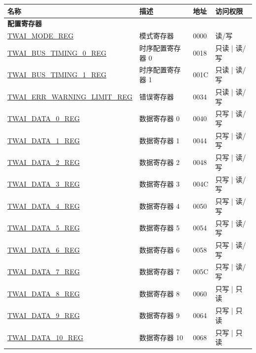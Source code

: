 \begin{longtable}{ | p{6cm} | p{6cm} | p{1.3cm} | p{2cm} | }
\hline\rowcolor{lightgray}
名称 & 描述 &  地址 & 访问权限 \\ \hline
\endhead
\multicolumn{4}{|l|}{\textbf{配置寄存器}} \\ \hline
\hyperref[regdesc:TWAIMODEREG]{TWAI\_MODE\_REG} & 模式寄存器 & \hexprefix{}0000 & 读/写 \\ \hline
\hyperref[regdesc:TWAIBUSTIMING0REG]{TWAI\_BUS\_TIMING\_0\_REG} & 时序配置寄存器 0 & \hexprefix{}0018 & 只读 | 读/写 \\ \hline
\hyperref[regdesc:TWAIBUSTIMING1REG]{TWAI\_BUS\_TIMING\_1\_REG} & 时序配置寄存器 1 & \hexprefix{}001C & 只读 | 读/写 \\ \hline
\hyperref[regdesc:TWAIERRWARNINGLIMITREG]{TWAI\_ERR\_WARNING\_LIMIT\_REG} & 错误寄存器 & \hexprefix{}0034 & 只读 | 读/写 \\ \hline
\hyperref[regdesc:TWAIDATA0REG]{TWAI\_DATA\_0\_REG} & 数据寄存器 0 & \hexprefix{}0040 & 只写 | 读/写 \\ \hline
\hyperref[regdesc:TWAIDATA1REG]{TWAI\_DATA\_1\_REG} & 数据寄存器 1 & \hexprefix{}0044 & 只写 | 读/写 \\ \hline
\hyperref[regdesc:TWAIDATA2REG]{TWAI\_DATA\_2\_REG} & 数据寄存器 2 & \hexprefix{}0048 & 只写 | 读/写 \\ \hline
\hyperref[regdesc:TWAIDATA3REG]{TWAI\_DATA\_3\_REG} & 数据寄存器 3 & \hexprefix{}004C & 只写 | 读/写 \\ \hline
\hyperref[regdesc:TWAIDATA4REG]{TWAI\_DATA\_4\_REG} & 数据寄存器 4 & \hexprefix{}0050 & 只写 | 读/写 \\ \hline
\hyperref[regdesc:TWAIDATA5REG]{TWAI\_DATA\_5\_REG} & 数据寄存器 5 & \hexprefix{}0054 & 只写 | 读/写 \\ \hline
\hyperref[regdesc:TWAIDATA6REG]{TWAI\_DATA\_6\_REG} & 数据寄存器 6 & \hexprefix{}0058 & 只写 | 读/写 \\ \hline
\hyperref[regdesc:TWAIDATA7REG]{TWAI\_DATA\_7\_REG} & 数据寄存器 7 & \hexprefix{}005C & 只写 | 读/写 \\ \hline
\hyperref[regdesc:TWAIDATA8REG]{TWAI\_DATA\_8\_REG} & 数据寄存器 8 & \hexprefix{}0060 & 只写 | 只读 \\ \hline
\hyperref[regdesc:TWAIDATA9REG]{TWAI\_DATA\_9\_REG} & 数据寄存器 9 & \hexprefix{}0064 & 只写 | 只读 \\ \hline
\hyperref[regdesc:TWAIDATA10REG]{TWAI\_DATA\_10\_REG} & 数据寄存器 10 & \hexprefix{}0068 & 只写 | 只读 \\ \hline

\end{longtable}
